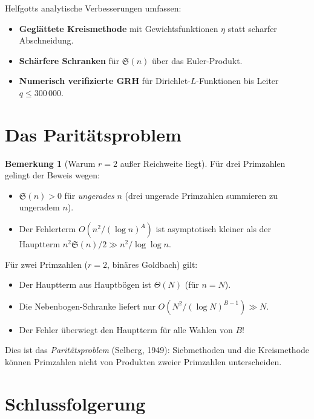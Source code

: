 \documentclass[12pt,a4paper]{amsart}
\theoremstyle{definition}
\newtheorem{bemerkung}[theorem]{Bemerkung}
\begin{document}
Helfgotts analytische Verbesserungen umfassen:
\begin{itemize}
  \item \textbf{Geglättete Kreismethode} mit Gewichtsfunktionen $\eta$
    statt scharfer Abschneidung.
  \item \textbf{Schärfere Schranken} für $\mathfrak{S}(n)$ über das
    Euler-Produkt.
  \item \textbf{Numerisch verifizierte GRH} für Dirichlet-$L$-Funktionen
    bis Leiter $q \leq 300\,000$.
\end{itemize}

\section{Das Paritätsproblem}
\label{sec:paritaet}

\begin{bemerkung}[Warum $r = 2$ außer Reichweite liegt]
  Für drei Primzahlen gelingt der Beweis wegen:
  \begin{itemize}
    \item $\mathfrak{S}(n) > 0$ für \emph{ungerades} $n$
      (drei ungerade Primzahlen summieren zu ungeradem $n$).
    \item Der Fehlerterm $O(n^2/(\log n)^A)$ ist asymptotisch kleiner
      als der Hauptterm $n^2 \mathfrak{S}(n)/2 \gg n^2/\log\log n$.
  \end{itemize}
  Für zwei Primzahlen ($r = 2$, binäres Goldbach) gilt:
  \begin{itemize}
    \item Der Hauptterm aus Hauptbögen ist $\Theta(N)$ (für $n = N$).
    \item Die Nebenbogen-Schranke liefert nur $O(N^2/(\log N)^{B-1}) \gg N$.
    \item Der Fehler überwiegt den Hauptterm für alle Wahlen von $B$!
  \end{itemize}
  Dies ist das \emph{Paritätsproblem} (Selberg, 1949): Siebmethoden
  und die Kreismethode können Primzahlen nicht von Produkten zweier
  Primzahlen unterscheiden.
\end{bemerkung}

\section{Schlussfolgerung}
\end{document}
